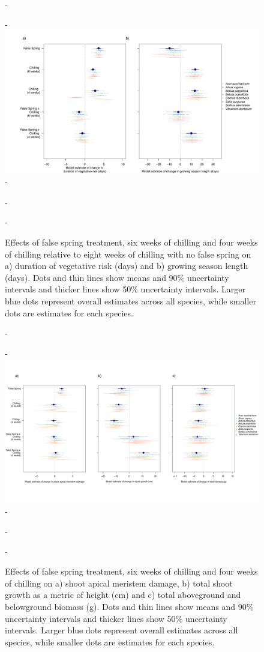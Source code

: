 \documentclass{article}\usepackage[]{graphicx}\usepackage[]{color}
\begin{document}
\begin{enumerate}
  {\begin{figure} [H]
  -\begin{center}
  -\includegraphics[width=18cm]{..//analyses/figures/mu_phen.pdf} 
  -\caption{Effects of false spring treatment, six weeks of chilling and four weeks of chilling relative to eight weeks of chilling with no false spring on a) duration of vegetative risk (days) and b) growing season length (days). Dots and thin lines show means and 90\% uncertainty intervals and thicker lines show 50\% uncertainty intervals. Larger blue dots represent overall estimates across all species, while smaller dots are estimates for each species. }\label{fig:muphen} 
  -\end{center}
  -\end{figure}}
  
  {\begin{figure} [H]
  -\begin{center}
  -\includegraphics[width=18cm, trim={0, 2cm, 0, 2cm}, clip]{..//analyses/figures/mu_growthbio.pdf} 
  -\caption{Effects of false spring treatment, six weeks of chilling and four weeks of chilling on a) shoot apical meristem damage, b) total shoot growth as a metric of height (cm) and c) total aboveground and belowground biomass (g). Dots and thin lines show means and 90\% uncertainty intervals and thicker lines show 50\% uncertainty intervals. Larger blue dots represent overall estimates across all species, while smaller dots are estimates for each species. }\label{fig:mugrowth} 
  -\end{center}
  -\end{figure}}
  

\end{enumerate}
\end{document}
